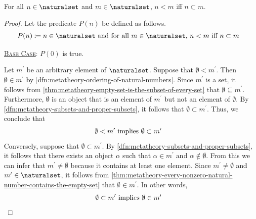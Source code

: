 \begin{thm}
     \label{thm:metatheory-less-than-relation-of-natural-numbers-is-equivalent-to-proper-subset-relation}
    For all \( n \in \naturalset \) and \( m \in \naturalset \), \( n < m \) iff \( n \subset m \).
\end{thm}

\begin{proof}
    Let the predicate \( P(n) \) be defined as follows.
    \begin{equation*}
        P(n) \coloneq n \in \naturalset \ \text{and for all \( m \in \naturalset \), \( n < m \) iff \( n \subset m \)}
    \end{equation*}
    
    \noindent
    \underline{\scshape Base Case}: \( P(0) \) is true.

    \vspace{0.3cm}
    \noindent
    Let \( m^{\prime} \) be an arbitrary element of \( \naturalset \).
    Suppose that \( \emptyset < m^{\prime} \).
    Then \( \emptyset \in m^{\prime} \) by \cref{dfn:metatheory-ordering-of-natural-numbers}.
    Since \( m^{\prime} \) is a set, it follows from \cref{thm:metatheory-empty-set-is-the-subset-of-every-set} that
    \( \emptyset \subseteq m^{\prime} \).
    Furthermore, \( \emptyset \) is an object that is an element of \( m^{\prime} \) but not an element of \( \emptyset \).
    By \cref{dfn:metatheory-subsets-and-proper-subsets}, it follows that \( \emptyset \subset m^{\prime} \).
    Thus, we conclude that
    \begin{equation*}
        \text{\( \emptyset < m^{\prime} \) implies \( \emptyset \subset m^{\prime} \)}
    \end{equation*}
    Conversely, suppose that \( \emptyset \subset m^{\prime} \).
    By \cref{dfn:metatheory-subsets-and-proper-subsets}, it follows that there exists an object \( \alpha \)
    such that \( \alpha \in m^{\prime} \) and \( \alpha \notin \emptyset \).
    From this we can infer that \( m^{\prime} \neq \emptyset \) because it contains at least one element.
    Since \( m^{\prime} \neq \emptyset \) and \( m^{\prime} \in \naturalset \), it follows from
    \cref{thm:metatheory-every-nonzero-natural-number-contains-the-empty-set} that \( \emptyset \in m^{\prime} \).
    In other words,
    \begin{equation*}
        \text{\( \emptyset \subset m^{\prime} \) implies \( \emptyset \in m^{\prime} \)}
    \end{equation*}


\end{proof}
